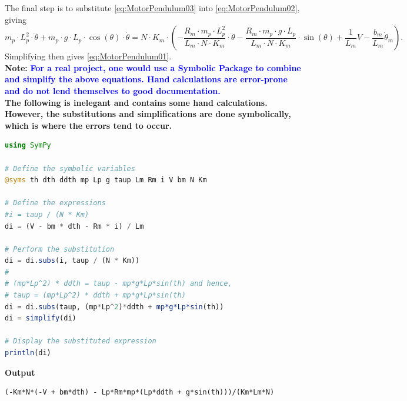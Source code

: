The final step is to substitute \eqref{eq:MotorPendulum03} into \eqref{eq:MotorPendulum02}, giving
\begin{equation}
\label{eq:MotorPendulum04}
   m_p \cdot L_p^2 \cdot \dddot{\theta} + m_p \cdot g\cdot L_p \cdot \cos(\theta) \cdot \dot{\theta} =  N \cdot  K_m \cdot \left( -\frac{R_m \cdot m_p \cdot L_p^2}{L_m \cdot N \cdot K_m} \cdot \ddot{\theta} - \frac{R_m \cdot m_p \cdot g\cdot L_p}{L_m \cdot N \cdot K_m} \cdot \sin(\theta) + \frac{1}{L_m }V - \frac{b_m}{L_m} \dot{\theta}_m \right).
\end{equation}
Simplifying then gives \eqref{eq:MotorPendulum01}. \\

\textbf{Note:} \textcolor{blue}{\bf For a real project, one would use a Symbolic Package to combine and simplify the above equations. Hand calculations are error-prone and do not lend themselves to good documentation.}\\

\textbf{The following is inelegant and contains some hand calculations. However, the substitutions and simplifications are done symbolically, which is where the errors tend to occur.}

\begin{lstlisting}[language=Julia,style=mystyle]
using SymPy

# Define the symbolic variables
@syms th dth ddth mp Lp g taup Lm Rm i V bm N Km

# Define the expressions
#i = taup / (N * Km)
di = (V - bm * dth - Rm * i) / Lm

# Perform the substitution
di = di.subs(i, taup / (N * Km))
# 
# (mp*Lp^2) * ddth = taup - mp*g*Lp*sin(th) and hence, 
# taup = (mp*Lp^2) * ddth + mp*g*Lp*sin(th) 
di = di.subs(taup, (mp*Lp^2)*ddth + mp*g*Lp*sin(th))
di = simplify(di)

# Display the substituted expression
println(di)
\end{lstlisting}
\textbf{Output} 
\begin{verbatim}
(-Km*N*(-V + bm*dth) - Lp*Rm*mp*(Lp*ddth + g*sin(th)))/(Km*Lm*N)
\end{verbatim}

